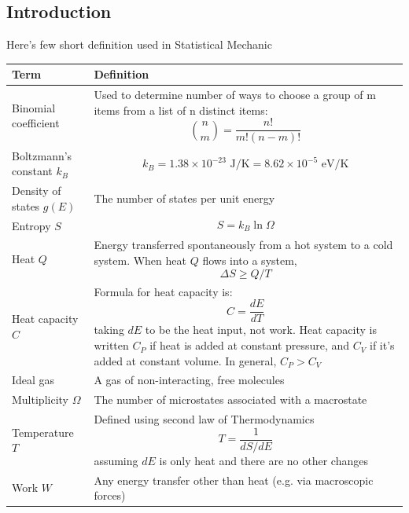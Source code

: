 \documentclass[../../main.tex]{subfiles}
\begin{document}
\subsection{Introduction}
Here's few short definition used in Statistical Mechanic 
\begin{center}
    \begin{longtable}{|p{}| p{}|}
        \hline
        Term&Definition\\\hline\hline
        Binomial coefficient& Used to determine number of ways to choose a group of m items from a list of n distinct items: \begin{equation*} \binom{n}{m} = \frac{n!}{m!(n-m)!} \end{equation*}\\\hline
        Boltzmann's constant $k_B$&  \begin{equation*}
            k_B=1.38 \times 10^{-23} \text{ J/K} = 8.62 \times 10^{-5} \text{ eV/K}
        \end{equation*}\\\hline
        Density of states $g(E)$&The number of states per unit energy\\\hline
        Entropy $S$&\begin{equation*}
            S=k_B\ln \Omega
        \end{equation*}\\\hline
        Heat $Q$&Energy transferred spontaneously from a hot system to a cold system. When heat $Q$ flows into a system, \begin{equation*}
            \Delta S \geq Q/T
        \end{equation*}\\\hline
        Heat capacity $C$&Formula for heat capacity is:\begin{equation*}
            C=\frac{dE}{dT}
        \end{equation*}taking $dE$ to be the heat input, not work. Heat capacity is written $C_P$ if heat is added at constant pressure,
        and $C_V$ if it's added at constant volume. In general, $C_P > C_V$\\\hline
        Ideal gas&A gas of non-interacting, free molecules\\\hline
        Multiplicity $\Omega$&The number of microstates associated with a macrostate\\\hline
        Temperature $T$&Defined using second law of Thermodynamics\begin{equation*}
            T=\frac{1}{dS/dE}
        \end{equation*}
        assuming $dE$ is only heat and there are no other changes\\\hline
        Work $W$&Any energy transfer other than heat (e.g. via macroscopic forces)\\\hline
    \end{longtable}
\end{center}
\end{document}
